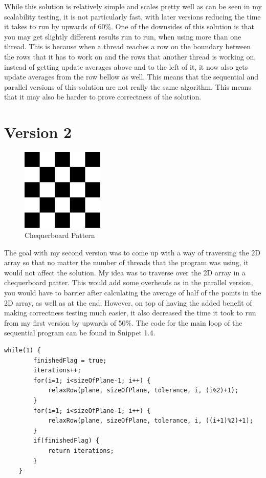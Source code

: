 \documentclass{report}
\begin{document}
While this solution is relatively simple and scales pretty well as can be seen in my scalability testing, it is not particularly fast, with later versions reducing the time it takes to run by upwards of 60\%. One of the downsides of this solution is that you may get slightly different results run to run, when using more than one thread. This is because when a thread reaches a row on the boundary between the rows that it has to work on and the rows that another thread is working on, instead of getting update averages above and to the left of it, it now also gets update averages from the row bellow as well. This means that the sequential and parallel versions of this solution are not really the same algorithm. This means that it may also be harder to prove correctness of the solution.
\section{Version 2}
\begin{figure}
\vspace{-30pt}
\includegraphics[width=0.35\textwidth]{checkerboard}
\caption{Chequerboard Pattern}
\label{fig:subim1}
\end{figure}
The goal with my second version was to come up with a way of traversing the 2D array so that no matter the number of threads that the program was using, it would not affect the solution. My idea was to traverse over the 2D array in a chequerboard patter. This would add some overheads as in the parallel version, you would have to barrier after calculating the average of half of the points in the 2D array, as well as at the end. However, on top of having the added benefit of making correctness testing much easier, it also decreased the time it took to run from my first version by upwards of 50\%. The code for the main loop of the sequential program can be found in Snippet 1.4.
\\
\begin{lstlisting}[style=customc,caption=Version 2 Sequential Main Loop]
    while(1) {
        finishedFlag = true;
        iterations++;
        for(i=1; i<sizeOfPlane-1; i++) {
            relaxRow(plane, sizeOfPlane, tolerance, i, (i%2)+1);
        }
        for(i=1; i<sizeOfPlane-1; i++) {
            relaxRow(plane, sizeOfPlane, tolerance, i, ((i+1)%2)+1);
        }
        if(finishedFlag) {
            return iterations;
        }
    }
\end{lstlisting}
\end{document}
